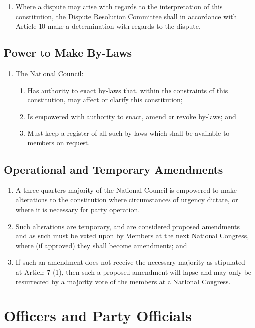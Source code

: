 \documentclass[a4paper,titlepage,8.5pt]{article}
\begin{document}
\begin{enumerate}
\item Where a dispute may arise with regards to the interpretation of this constitution, the Dispute Resolution Committee shall in accordance with Article 10 make a determination with regards to the dispute.
\end{enumerate}

\subsection{Power to Make By-Laws}

\begin{enumerate}
\item The National Council:
\begin{enumerate}
\item Has authority to enact by-laws that, within the constraints of this constitution, may affect or clarify this constitution;
\item Is empowered with authority to enact, amend or revoke by-laws; and
\item Must keep a register of all such by-laws which shall be available to members on request.
\end{enumerate}
\end{enumerate}

\subsection{Operational and Temporary Amendments}

\begin{enumerate}
\item A three-quarters majority of the National Council is empowered to make alterations to the constitution where circumstances of urgency dictate, or where it is necessary for party operation.
\item Such alterations are temporary, and are considered proposed amendments and as such must be voted upon by Members at the next National Congress, where (if approved) they shall become amendments; and
\item If such an amendment does not receive the necessary majority as stipulated at Article 7 (1), then such a proposed amendment will lapse and may only be resurrected by a majority vote of the members at a National Congress.
\end{enumerate}

\section{Officers and Party Officials}
\end{document}
